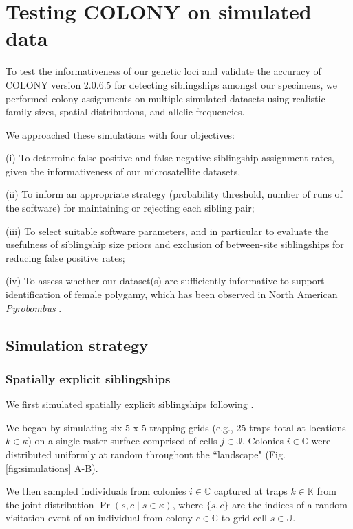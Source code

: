 \documentclass[12pt]{article}
\begin{document}
\section{Testing COLONY on simulated data}
To test the informativeness of our genetic loci and validate the accuracy of COLONY version 2.0.6.5 \parencite{jonesCOLONYProgramParentage2010} for detecting siblingships amongst our specimens, we performed colony assignments on multiple simulated datasets using realistic family sizes, spatial distributions, and allelic frequencies.

We approached these simulations with four objectives:

(i) To determine false positive and false negative siblingship assignment rates, given the informativeness of our microsatellite datasets, 

(ii) To inform an appropriate strategy (probability threshold, number of runs of the software) for maintaining or rejecting each sibling pair;

(iii) To select suitable software parameters, and in particular to evaluate the usefulness of siblingship size priors and exclusion of between-site siblingships for reducing false positive rates;

(iv) To assess whether our dataset(s) are sufficiently informative to support identification of female polygamy, which has been observed in North American \emph{Pyrobombus} \parencite{payneFrequencyMultiplePaternity2003, owenMonandryPolyandryThree2013}. \\

\subsection{Simulation strategy}

\subsubsection{Spatially explicit siblingships}
We first simulated spatially explicit siblingships following \textcite{popeInferringForagingRanges2017}. 

We began by simulating six 5 x 5 trapping grids (e.g., 25 traps total at locations $k \in \kappa$) on a single raster surface comprised of cells $j \in \mathbb{J}$. Colonies $i \in \mathbb{C}$ were distributed uniformly at random throughout the ``landscape" (Fig. \ref{fig:simulations} A-B).

We then sampled individuals from colonies $i \in \mathbb{C}$ captured at traps $k \in \mathbb{K}$ from the joint distribution $\Pr(s, c \mid s \in \kappa)$, where $\{s,c\}$ are the indices of a random visitation event of an individual from colony $c \in \mathbb{C}$ to grid cell $s \in \mathbb{J}$.
\end{document}
